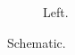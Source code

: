 \documentclass{jfm}
\begin{document}
\begin{figure}\begin{subfigure}{.4\textwidth}\caption{Left.}\end{subfigure}\caption{Schematic.}\end{figure}
\begin{table}\caption{Values.}\end{table}
\end{document}

